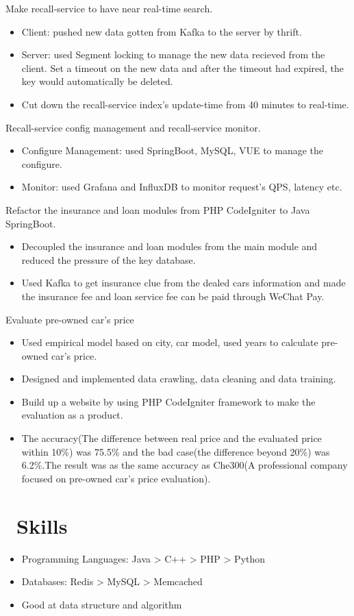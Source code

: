 \documentclass{resume}
\begin{document}
Make recall-service to have near real-time search.
\begin{itemize}
  \item Client: pushed new data gotten from Kafka to the server by thrift.
  \item Server: used Segment locking to manage the new data recieved from the client. Set a timeout on the new data and after the timeout had expired, the key would automatically be deleted.
  \item Cut down the recall-service index's update-time from 40 minutes to real-time.
\end{itemize}

Recall-service config management and recall-service monitor.
\begin{itemize}
  \item Configure Management: used SpringBoot, MySQL, VUE to manage the configure.
  \item Monitor: used Grafana and InfluxDB to monitor request's QPS, latency etc.
\end{itemize}

Refactor the insurance and loan modules from PHP CodeIgniter to Java SpringBoot.
\begin{itemize}
  \item Decoupled the insurance and loan modules from the main module and reduced the pressure of the key database.
  \item Used Kafka to get insurance clue from the dealed cars information and made the insurance fee and loan service fee can be paid through WeChat Pay.
\end{itemize}

Evaluate pre-owned car's price
\begin{itemize}
  \item Used empirical model based on city, car model, used years to calculate pre-owned car's price.
  \item Designed and implemented data crawling, data cleaning and data training.
  \item Build up a website by using PHP CodeIgniter framework to make the evaluation as a product.
  \item The accuracy(The difference between real price and the evaluated price within 10\%) was 75.5\% and the bad case(the difference beyond 20\%) was 6.2\%.The result was as the same accuracy as Che300(A professional company focused on pre-owned car's price evaluation).
\end{itemize}

\section{\faCogs\ Skills}
\begin{itemize}[parsep=0.5ex]
  \item Programming Languages: Java > C++ > PHP > Python
  \item Databases: Redis > MySQL > Memcached
  \item Good at data structure and algorithm
\end{itemize}
\end{document}
